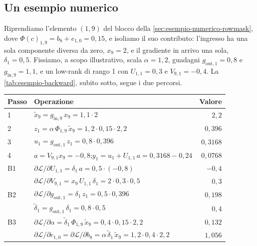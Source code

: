 \subsection{Un esempio numerico}
\label{sec:esempio-backward}

Riprendiamo l'elemento $(1,9)$ del blocco della \autoref{sec:esempio-numerico-rowmask}, dove $\Phi(c)_{1,9}=b_8+e_{1,0}=0{,}15$, e isoliamo il suo contributo: l'ingresso ha una sola componente diversa da zero, $x_9=2$, e il gradiente in arrivo una sola, $\delta_1=0{,}5$. Fissiamo, a scopo illustrativo, scala $\alpha=1{,}2$, guadagni $g_{\mathrm{out},1}=0{,}8$ e $g_{\mathrm{in},9}=1{,}1$, e un low-rank di rango 1 con $U_{1,1}=0{,}3$ e $V_{9,1}=-0{,}4$. La \autoref{tab:esempio-backward}, subito sotto, segue i due percorsi.

\begin{table}[H]
\centering
\small
\renewcommand{\arraystretch}{1.3}
\begin{tabular}{>{\raggedright\arraybackslash}p{12mm}>{\raggedright\arraybackslash}p{70mm}r}
\toprule
Passo & Operazione & Valore \\
\midrule
\rowcolor{steraBlu!10} 1 & $\tilde x_9=g_{\mathrm{in},9}\,x_9=1{,}1\cdot2$ & $2{,}2$ \\
\rowcolor{steraBlu!10} 2 & $z_1=\alpha\,\Phi_{1,9}\,\tilde x_9=1{,}2\cdot0{,}15\cdot2{,}2$ & $0{,}396$ \\
\rowcolor{steraBlu!10} 3 & $u_1=g_{\mathrm{out},1}\,z_1=0{,}8\cdot0{,}396$ & $0{,}3168$ \\
\rowcolor{steraBlu!10} 4 & $a=V_{9,1}x_9=-0{,}8$;\quad $y_1=u_1+U_{1,1}\,a=0{,}3168-0{,}24$ & $0{,}0768$ \\
\midrule
\rowcolor{steraArancio!12} B1 & $\partial\mathcal L/\partial U_{1,1}=\delta_1\,a=0{,}5\cdot(-0{,}8)$ & $-0{,}4$ \\
\rowcolor{steraArancio!12} & $\partial\mathcal L/\partial V_{9,1}=x_9\,U_{1,1}\,\delta_1=2\cdot0{,}3\cdot0{,}5$ & $0{,}3$ \\
\rowcolor{steraArancio!12} B2 & $\partial\mathcal L/\partial g_{\mathrm{out},1}=\delta_1\,z_1=0{,}5\cdot0{,}396$ & $0{,}198$ \\
\rowcolor{steraArancio!12} & $\tilde\delta_1=g_{\mathrm{out},1}\,\delta_1=0{,}8\cdot0{,}5$ & $0{,}4$ \\
\rowcolor{steraArancio!12} B3 & $\partial\mathcal L/\partial\alpha=\tilde\delta_1\,\Phi_{1,9}\,\tilde x_9=0{,}4\cdot0{,}15\cdot2{,}2$ & $0{,}132$ \\
\rowcolor{steraArancio!12} & $\partial\mathcal L/\partial e_{1,0}=\partial\mathcal L/\partial b_8=\alpha\,\tilde\delta_1\,\tilde x_9=1{,}2\cdot0{,}4\cdot2{,}2$ & $1{,}056$ \\

\end{tabular}
\end{table}
